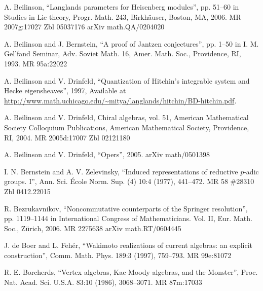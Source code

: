 \par\noindent [Beilinson 2006] A. Beilinson, ``Langlands parameters for Heisenberg modules'', pp. 51--60 in Studies in Lie theory, Progr. Math. 243, Birkh\"auser, Boston, MA, 2006. MR 2007g:17027 Zbl 05037176 arXiv math.QA/0204020

\par{} A. Beilinson and J. Bernstein, ``A proof of Jantzen conjectures'', pp. 1--50 in I. M. Gel'fand Seminar, Adv. Soviet Math. 16, Amer. Math. Soc., Providence, RI, 1993. MR 95a:22022

\par{} A. Beilinson and V. Drinfeld, ``Quantization of Hitchin's integrable system and Hecke eigensheaves'', 1997, Available at \url{http://www.math.uchicago.edu/~mitya/langlands/hitchin/BD-hitchin.pdf}.

\par{} A. Beilinson and V. Drinfeld, Chiral algebras, vol. 51, American Mathematical Society Colloquium Publications, American Mathematical Society, Providence, RI, 2004. MR 2005d:17007 Zbl 02121180

\par{} A. Beilinson and V. Drinfeld, ``Opers'', 2005. arXiv math/0501398

\par{} I. N. Bernstein and A. V. Zelevinsky, ``Induced representations of reductive $p$-adic groups. I'', Ann. Sci. \'Ecole Norm. Sup. (4) 10:4 (1977), 441--472. MR 58 \#28310 Zbl 0412.22015

\par\noindent [Bezrukavnikov 2006] R. Bezrukavnikov, ``Noncommutative counterparts of the Springer resolution'', pp. 1119--1144 in International Congress of Mathematicians. Vol. II, Eur. Math. Soc., Z\"urich, 2006. MR 2275638 arXiv math.RT/0604445

\par{} J. de Boer and L. Feh\'er, ``Wakimoto realizations of current algebras: an explicit construction'', Comm. Math. Phys. 189:3 (1997), 759--793. MR 99e:81072

\par\noindent [Borcherds 1986] R. E. Borcherds, ``Vertex algebras, Kac-Moody algebras, and the Monster'', Proc. Nat. Acad. Sci. U.S.A. 83:10 (1986), 3068--3071. MR 87m:17033

